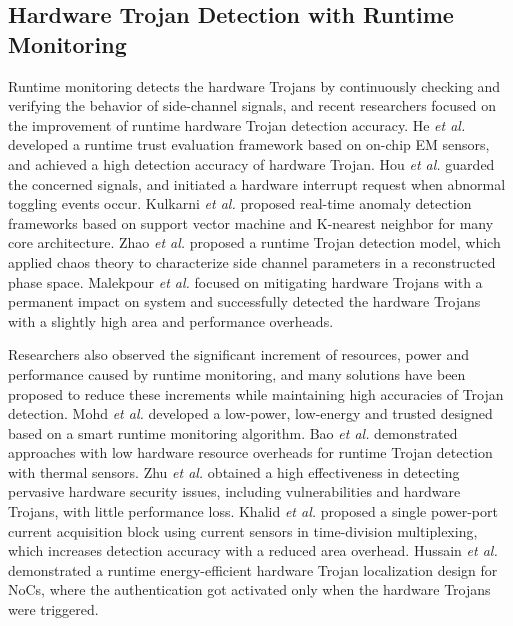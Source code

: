 \documentclass[10pt,journal]{IEEEtran}
\begin{document}
\subsection{Hardware Trojan Detection with Runtime Monitoring}

Runtime monitoring detects the hardware Trojans by continuously checking and verifying the behavior of side-channel signals, and recent researchers focused on the improvement of runtime hardware Trojan detection accuracy. He \textit{et al.} \cite{conference:JH} developed a runtime trust evaluation framework based on on-chip EM sensors, and achieved a high detection accuracy of hardware Trojan. Hou \textit{et al.} \cite{article:YH} guarded the concerned signals, and initiated a hardware interrupt request when abnormal toggling events occur. Kulkarni \textit{et al.} \cite{conference:AK}\cite{article:AK} proposed real-time anomaly detection frameworks based on support vector machine and K-nearest neighbor for many core architecture. Zhao \textit{et al.} \cite{article:HZ} proposed a runtime Trojan detection model, which applied chaos theory to characterize side channel parameters in a reconstructed phase space. Malekpour \textit{et al.} \cite{conference:AM} focused on mitigating hardware Trojans with a permanent impact on system and successfully detected the hardware Trojans with a slightly high area and performance overheads.

Researchers also observed the significant increment of resources, power and performance caused by runtime monitoring, and many solutions have been proposed to reduce these increments while maintaining high accuracies of Trojan detection. Mohd \textit{et al.} \cite{article:BM} developed a low-power, low-energy and trusted designed based on a smart runtime monitoring algorithm. Bao \textit{et al.} \cite{article:CB} demonstrated approaches with low hardware resource overheads for runtime Trojan detection with thermal sensors. Zhu \textit{et al.} \cite{article:JZ} obtained a high effectiveness in detecting pervasive hardware security issues, including vulnerabilities and hardware Trojans, with little performance loss. Khalid \textit{et al.} \cite{article:FK} proposed a single power-port current acquisition block using current sensors in time-division multiplexing, which increases detection accuracy with a reduced area overhead. Hussain \textit{et al.} \cite{conference:MH} demonstrated a runtime energy-efficient hardware Trojan localization design for NoCs, where the authentication got activated only when the hardware Trojans were triggered.
\end{document}

